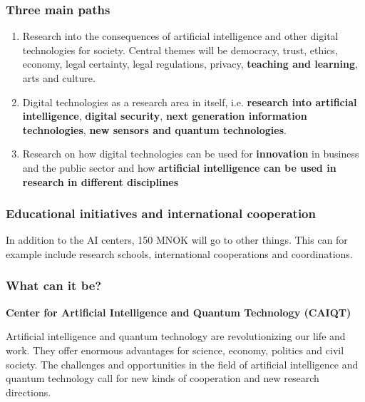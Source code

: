 \documentclass{beamer}
\begin{document}
\begin{frame}
\frametitle{Three main paths}

\begin{enumerate}
\item Research into the consequences of artificial intelligence and other digital technologies for society. Central themes will be democracy, trust, ethics, economy, legal certainty, legal regulations, privacy, \textbf{teaching and learning}, arts and culture.

\item Digital technologies as a research area in itself, i.e. \textbf{research into artificial intelligence}, \textbf{digital security}, \textbf{next generation information technologies}, \textbf{new sensors and quantum technologies}.

\item Research on how digital technologies can be used for \textbf{innovation} in business and the public sector and how \textbf{artificial intelligence can be used in research in different disciplines}
\end{enumerate}

\noindent
\end{frame}

\begin{frame}
\frametitle{Educational initiatives and international cooperation}

In addition to the AI centers, 150 MNOK will go to other things. This
can for example include research schools, international cooperations
and coordinations.
\end{frame}

\begin{frame}
\frametitle{What can it be?}

\textbf{Center for Artificial Intelligence and Quantum Technology (CAIQT)}

Artificial intelligence and quantum technology are revolutionizing our
life and work. They offer enormous advantages for science, economy,
politics and civil society.
The challenges and opportunities in the field of artificial
intelligence and quantum technology call for new kinds of cooperation and new research directions.
\end{frame}
\end{document}
